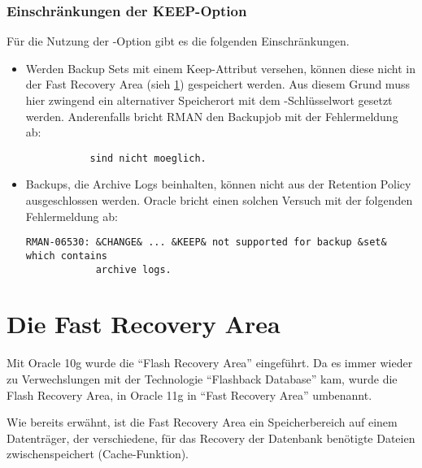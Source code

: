         \subsubsection{Einschränkungen der KEEP-Option}
          Für die Nutzung der -Option gibt es die folgenden Einschränkungen.
          \begin{itemize}
            \item Werden Backup Sets mit einem Keep-Attribut versehen, können diese nicht in der Fast Recovery Area (sieh \ref{configureflashrecoveryarea}) gespeichert werden. Aus diesem Grund muss hier zwingend ein alternativer Speicherort mit dem -Schlüsselwort gesetzt werden. Anderenfalls bricht RMAN den Backupjob mit der Fehlermeldung ab:
            \begin{lstlisting}[caption={Keine Dateien mit KEEP-Attribut in der FRA aufbewahren!},label=admin1031,language=terminal]
% ORA-19811: Dateien in DB_RECOVERY_FILE_DEST mit Keep-Attribut
           sind nicht moeglich.
            \end{lstlisting}
            \item Backups, die Archive Logs beinhalten, können nicht aus der Retention Policy ausgeschlossen werden. Oracle bricht einen solchen Versuch mit der folgenden Fehlermeldung ab:
            \begin{lstlisting}[caption={Backups mit Archive Logs dürfen kein KEEP-Attribut haben!},label=admin1032,language=terminal]
RMAN-06530: &CHANGE& ... &KEEP& not supported for backup &set& which contains
            archive logs.
            \end{lstlisting}
          \end{itemize}
    \section{Die Fast Recovery Area}
      \label{configureflashrecoveryarea}
      \begin{merke}
        Mit Oracle 10g wurde die \enquote{Flash Recovery Area} eingeführt. Da es immer wieder zu Verwechslungen mit der Technologie \enquote{Flashback Database} kam, wurde die Flash Recovery Area, in Oracle 11g in \enquote{Fast Recovery Area} umbenannt.
      \end{merke}
      Wie bereits erwähnt, ist die Fast Recovery Area ein Speicherbereich auf einem Daten\-träger, der verschiedene, für das Recovery der Datenbank benötigte Dateien zwischenspeichert (Cache-Funktion).

